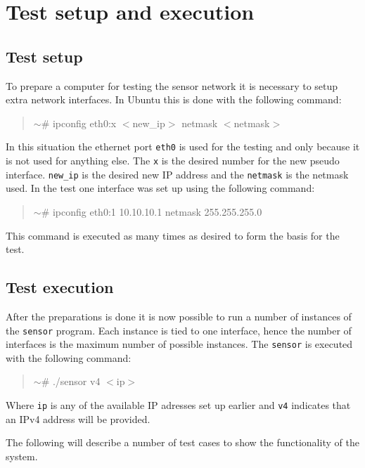 \section{Test setup and execution}
\label{sec:appendixtest}
\subsection{Test setup}
\label{subsec:testsetup}
To prepare a computer for testing the sensor network it is necessary to setup extra network interfaces. In Ubuntu this is done with the following command:
\begin{quotation}
    $\sim$\# ipconfig eth0:x $<$new\_ip$>$ netmask $<$netmask$>$
\end{quotation}
In this situation the ethernet port \texttt{eth0} is used for the testing and only because it is not used for anything else. The \texttt{x} is the desired number for the new pseudo interface. \texttt{new\_ip} is the desired new IP address and the \texttt{netmask} is the netmask used. In the test one interface was set up using the following command: 
\begin{quotation}
    $\sim$\# ipconfig eth0:1 10.10.10.1 netmask 255.255.255.0
\end{quotation}

This command is executed as many times as desired to form the basis for the test.

\subsection{Test execution}
\label{subsec:testexecution}
After the preparations is done it is now possible to run a number of instances of the \texttt{sensor} program. Each instance is tied to one interface, hence the number of interfaces is the maximum number of possible instances. The \texttt{sensor} is executed with the following command:
\begin{quotation}
    $\sim$\# ./sensor v4 $<$ip$>$
\end{quotation}
Where \texttt{ip} is any of the available IP adresses set up earlier and \texttt{v4} indicates that an IPv4 address will be provided.

The following will describe a number of test cases to show the functionality of the system.
